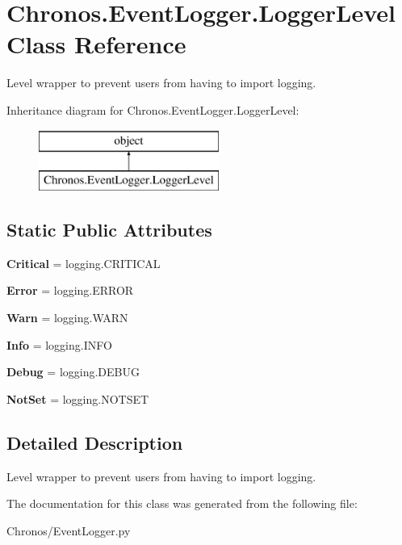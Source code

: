 \hypertarget{classChronos_1_1EventLogger_1_1LoggerLevel}{}\section{Chronos.\+Event\+Logger.\+Logger\+Level Class Reference}
\label{classChronos_1_1EventLogger_1_1LoggerLevel}


Level wrapper to prevent users from having to import logging.  


Inheritance diagram for Chronos.\+Event\+Logger.\+Logger\+Level\+:\begin{figure}[H]
\begin{center}
\leavevmode
\includegraphics[height=2.000000cm]{classChronos_1_1EventLogger_1_1LoggerLevel}
\end{center}
\end{figure}
\subsection*{Static Public Attributes}
\begin{DoxyCompactItemize}
\item 
{\bfseries Critical} = logging.\+C\+R\+I\+T\+I\+C\+AL
\item 
{\bfseries Error} = logging.\+E\+R\+R\+OR
\item 
{\bfseries Warn} = logging.\+W\+A\+RN
\item 
{\bfseries Info} = logging.\+I\+N\+FO
\item 
{\bfseries Debug} = logging.\+D\+E\+B\+UG
\item 
{\bfseries Not\+Set} = logging.\+N\+O\+T\+S\+ET
\end{DoxyCompactItemize}


\subsection{Detailed Description}
Level wrapper to prevent users from having to import logging. 

The documentation for this class was generated from the following file\+:\begin{DoxyCompactItemize}
\item 
Chronos/Event\+Logger.\+py\end{DoxyCompactItemize}
